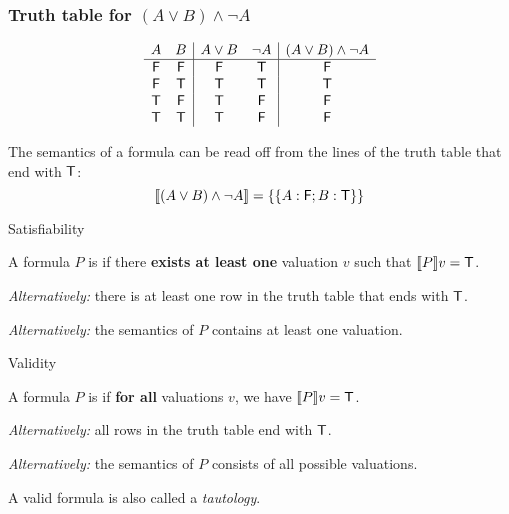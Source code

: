 \documentclass[xetex,aspectratio=169,14pt,hyperref={pdfpagelabels=true,pdflang={en-GB}}]{beamer}
\begin{document}
\begin{frame}[t]
  \frametitle{Truth table for $(A \lor B) \land \lnot A$}
  {\scriptsize \begin{displaymath}
      \begin{array}{cc|cc|c}
        A&B&A \lor B&\lnot A& (A \lor B) \land \lnot A\\
        \hline
        \mathsf{F}&\mathsf{F}&\mathsf{F}&\mathsf{T}&\mathsf{F}\\
        \mathsf{F}&\mathsf{T} &\mathsf{T} &\mathsf{T}&\mathsf{T}\\
        \mathsf{T} &\mathsf{F}&\mathsf{T} &\mathsf{F}&\mathsf{F}\\
        \mathsf{T} &\mathsf{T} &\mathsf{T} &\mathsf{F}&\mathsf{F}\\
      \end{array}
    \end{displaymath}}

  The semantics of a formula can be read off from the lines of the truth table that end with $\mathsf{T}$:
  \begin{displaymath}
    \llbracket (A \lor B) \land \lnot A \rrbracket = \left\{ \{ A : \mathsf{F}; B : \mathsf{T} \} \right\}
  \end{displaymath}
\end{frame}

\begin{frame}
  {Satisfiability}

  A formula $P$ is  if there {\bf exists at
    least one} valuation $v$ such that $\llbracket P \rrbracket v = \mathsf{T}$.

  \bigskip
  \pause

  \emph{Alternatively:} there is at least one row in the truth table
  that ends with $\mathsf{T}$.

  \bigskip
  \pause

  \emph{Alternatively:} the semantics of $P$ contains at least one
  valuation.
\end{frame}

\begin{frame}
  {Validity}

  A formula $P$ is  if {\bf for all} valuations $v$,
  we have $\llbracket P \rrbracket v = \mathsf{T}$.

  \bigskip
  \pause

  \emph{Alternatively:} all rows in the truth table end with $\mathsf{T}$.

  \bigskip
  \pause

  \emph{Alternatively:} the semantics of $P$ consists of all possible
  valuations.

  \bigskip
  \pause

  A valid formula is also called a \emph{tautology}.
\end{frame}
\end{document}
